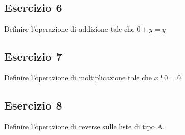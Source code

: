 \subsection{Esercizio 6}
\begin{thm}
	Definire l'operazione di addizione tale che $0 + y = y$
\end{thm}


\subsection{Esercizio 7}
\begin{thm}
	Definire l'operazione di moltiplicazione tale che $x * 0 = 0$
\end{thm}


\subsection{Esercizio 8}
\begin{thm}
	Definire l'operazione di reverse sulle liste di tipo A.
\end{thm}
